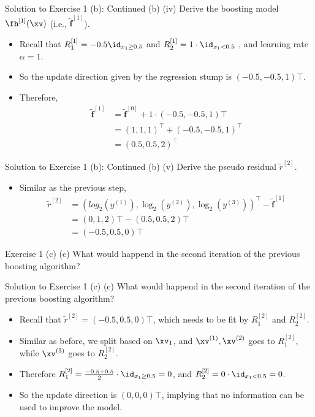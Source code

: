 \documentclass[aspectratio=169]{beamer}
\newcommand{\fhx}[1]{\fh^{[#1]}(\xv)}
\newcommand{\rtilde}[1]{\tilde{r}^{[#1]}}
\newcommand{\fhv}[1]{\tilde{\bm{f}}^{[#1]}}
\begin{document}
\begin{frame}{Solution to Exercise 1 (b): Continued}
	(b) (iv) Derive the boosting model $\fhx{1}$ (i.e., $\fhv{1}$).
	\begin{itemize}
		\item<2-> Recall that $R_1^{[1]} = - 0.5 \id_{x_1 \geq 0.5}$ and $R_2^{[1]} = 1 \cdot \id_{x_1 < 0.5}$ , and learning rate $\alpha = 1$.
		\item<3-> So the update direction given by the regression stump is $(-0.5, -0.5, 1)\top$.
		\item<4-> Therefore, 
			\begin{align*}
				\fhv{1} &= \fhv{0} + 1 \cdot (- 0.5, - 0.5, 1)\top \\
				&= (1, 1, 1)^\top + (-0.5, -0.5, 1)^\top \\
				&= (0.5, 0.5, 2)^\top
			\end{align*}
	\end{itemize}
\end{frame}

\begin{frame}{Solution to Exercise 1 (b): Continued}
	(b) (v) Derive the pseudo residual $\rtilde{2}$.
	\begin{itemize}
		\item Similar as the previous step, 
			\begin{align*}
				\rtilde{2} & = \left(log_2(y^{(1)}), \log_2(y^{(2)}), \log_2 (y^{(3)}) \right)^\top - \fhv{1} \\
				&= (0, 1, 2)\top - (0.5, 0.5, 2)\top \\
				&= (-0.5, 0.5, 0)\top
			\end{align*}
	\end{itemize}
\end{frame}

\begin{frame}{Exercise 1 (c)}
	(c) What would happend in the second iteration of the previous boosting algorithm?
\end{frame}

\begin{frame}{Solution to Exercise 1 (c)}
	(c) What would happend in the second iteration of the previous boosting algorithm?

	\vspace{10pt}
	\begin{itemize}
		\item<2-> Recall that $\rtilde{2} = (-0.5, 0.5, 0)\top$, which needs to be fit by $R_1^{[2]}$ and $R_2^{[2]}$. 
		\item<3-> Similar as before, we split based on $\xv_1$, and $\xv^{(1)}, \xv^{(2)}$ goes to $R_1^{[2]}$, while $\xv^{(3)}$ goes to $R_2^{[2]}$.
		\item<4-> Therefore $R_1^{[2]} = \frac{-0.5 + 0.5}{2} \cdot \id_{x_1 \geq 0.5} = 0$, and $R_2^{[2]} = 0 \cdot \id_{x_1 < 0.5} = 0$.
		\item<5-> So the update direction is $(0, 0, 0)\top$, implying that no information can be used to improve the model.
	\end{itemize}
\end{frame}
\end{document}
